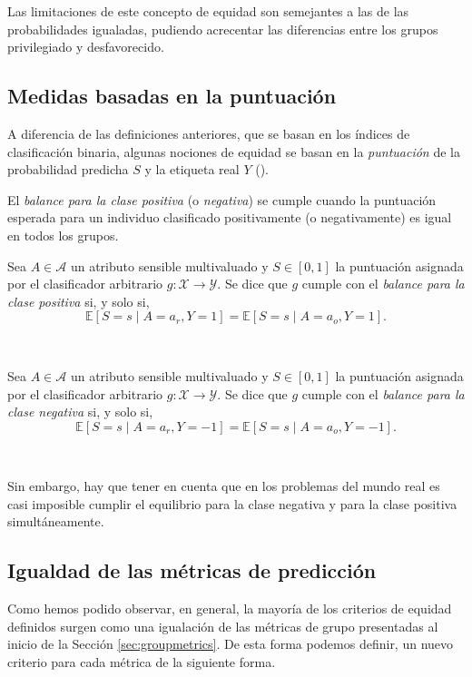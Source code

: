 \documentclass[oneside,openright,titlepage,numbers=noenddot,openany,headinclude,footinclude=true,
cleardoublepage=empty,abstractoff,BCOR=5mm,paper=a4,fontsize=12pt,main=spanish]{scrreprt}
\begin{document}
Las limitaciones de este concepto de equidad son semejantes a las de las probabilidades igualadas, pudiendo acrecentar las diferencias entre los grupos privilegiado y desfavorecido.

\subsection{Medidas basadas en la puntuación}

A diferencia de las definiciones anteriores, que se basan en los índices de clasificación binaria, algunas nociones de equidad se basan en la \textit{puntuación} de la probabilidad predicha $S$ y la etiqueta real $Y$ (\cite{catalogue2018}).

El \textit{balance para la clase positiva} (o \textit{negativa}) se cumple cuando la puntuación esperada para un individuo clasificado positivamente (o negativamente) es igual en todos los grupos.\\

\begin{definition}
Sea $A \in \mathcal{A}$ un atributo sensible multivaluado y $S\in [0,1]$ la puntuación asignada por el clasificador arbitrario $g\colon \mathcal{X} \to \mathcal{Y}$. Se dice que $g$ cumple con el \textit{balance para la clase positiva} si, y solo si, $$\mathbb{E}[S=s \mid A=a_r,Y=1]=\mathbb{E}[S=s \mid A=a_o,Y=1].$$
\end{definition}\

\begin{definition}
Sea $A \in \mathcal{A}$ un atributo sensible multivaluado y $S\in [0,1]$ la puntuación asignada por el clasificador arbitrario $g\colon \mathcal{X} \to \mathcal{Y}$. Se dice que $g$ cumple con el \textit{balance para la clase negativa} si, y solo si, $$\mathbb{E}[S=s \mid A=a_r, Y=-1]=\mathbb{E}[S=s \mid A=a_o, Y=-1].$$
\end{definition}\

Sin embargo, hay que tener en cuenta que
en los problemas del mundo real es casi imposible cumplir el equilibrio para la clase negativa y para la clase positiva simultáneamente.

\clearpage

\subsection{Igualdad de las métricas de predicción}

Como hemos podido observar, en general, la mayoría de los criterios de equidad definidos surgen como una igualación de las métricas de grupo presentadas al inicio de la Sección \ref{sec:groupmetrics}. De esta forma podemos definir, un nuevo criterio para cada métrica de la siguiente forma.\\
\end{document}
